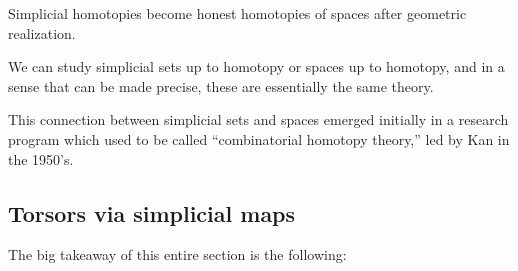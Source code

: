\documentclass[11pt,openany]{book}
\begin{document}
\begin{corollary}
Simplicial homotopies become honest homotopies of spaces after geometric realization.
\end{corollary}

\begin{remark}
We can study simplicial sets up to homotopy or spaces up to homotopy, and in a sense that can be made precise, these are essentially the same theory.
\end{remark}

\begin{remark}
This connection between simplicial sets and spaces emerged initially in a research program which used to be called ``combinatorial homotopy theory,'' led by Kan in the 1950's. %
\end{remark}

\subsection{Torsors via simplicial maps}

The big takeaway of this entire section is the following:
\end{document}
